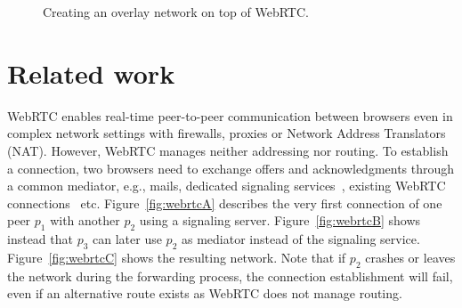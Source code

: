 
\begin{figure*}
\centering
{}
\hspace{5pt}
\hspace{5pt}
\caption{\label{fig:webrtc}Creating an overlay network on top of WebRTC.}
\end{figure*}


\section{Related work}
\label{sec:relatedwork}

WebRTC enables real-time peer-to-peer communication between browsers
even in complex network settings with firewalls, proxies or Network
Address Translators (NAT). However, WebRTC manages neither addressing
nor routing. To establish a connection, two browsers need to exchange
offers and acknowledgments through a common mediator, e.g., mails,
dedicated signaling services~\cite{peerjs}, existing WebRTC
connections~\cite{p} etc. Figure~\ref{fig:webrtcA} describes the very
first connection of one peer $p_1$ with another $p_2$ using a
signaling server. Figure~\ref{fig:webrtcB} shows instead that $p_3$
can later use $p_2$ as mediator instead of the signaling
service. Figure~\ref{fig:webrtcC} shows the resulting network. Note
that if $p_2$ crashes or leaves the network during the forwarding
process, the connection establishment will fail, even if an
alternative route exists as WebRTC does not manage routing.

